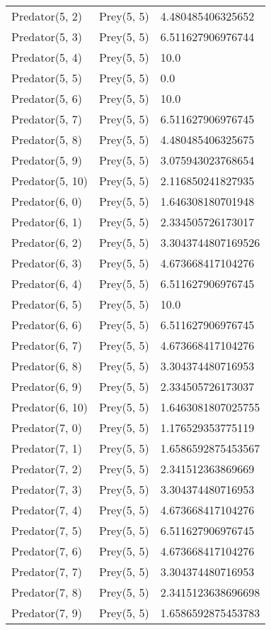 \begin{longtable}{| p{} | p{} | p{} |}
Predator(5, 2) & Prey(5, 5) &4.480485406325652\\
Predator(5, 3) & Prey(5, 5) &6.511627906976744\\
Predator(5, 4) & Prey(5, 5) &10.0\\
Predator(5, 5) & Prey(5, 5) &0.0\\
Predator(5, 6) & Prey(5, 5) &10.0\\
Predator(5, 7) & Prey(5, 5) &6.511627906976745\\
Predator(5, 8) & Prey(5, 5) &4.480485406325675\\
Predator(5, 9) & Prey(5, 5) &3.075943023768654\\
Predator(5, 10) & Prey(5, 5) &2.116850241827935\\
Predator(6, 0) & Prey(5, 5) &1.646308180701948\\
Predator(6, 1) & Prey(5, 5) &2.334505726173017\\
Predator(6, 2) & Prey(5, 5) &3.3043744807169526\\
Predator(6, 3) & Prey(5, 5) &4.673668417104276\\
Predator(6, 4) & Prey(5, 5) &6.511627906976745\\
Predator(6, 5) & Prey(5, 5) &10.0\\
Predator(6, 6) & Prey(5, 5) &6.511627906976745\\
Predator(6, 7) & Prey(5, 5) &4.673668417104276\\
Predator(6, 8) & Prey(5, 5) &3.304374480716953\\
Predator(6, 9) & Prey(5, 5) &2.334505726173037\\
Predator(6, 10) & Prey(5, 5) &1.6463081807025755\\
Predator(7, 0) & Prey(5, 5) &1.176529353775119\\
Predator(7, 1) & Prey(5, 5) &1.6586592875453567\\
Predator(7, 2) & Prey(5, 5) &2.341512363869669\\
Predator(7, 3) & Prey(5, 5) &3.304374480716953\\
Predator(7, 4) & Prey(5, 5) &4.673668417104276\\
Predator(7, 5) & Prey(5, 5) &6.511627906976745\\
Predator(7, 6) & Prey(5, 5) &4.673668417104276\\
Predator(7, 7) & Prey(5, 5) &3.304374480716953\\
Predator(7, 8) & Prey(5, 5) &2.3415123638696698\\
Predator(7, 9) & Prey(5, 5) &1.6586592875453783\\

\end{longtable}

